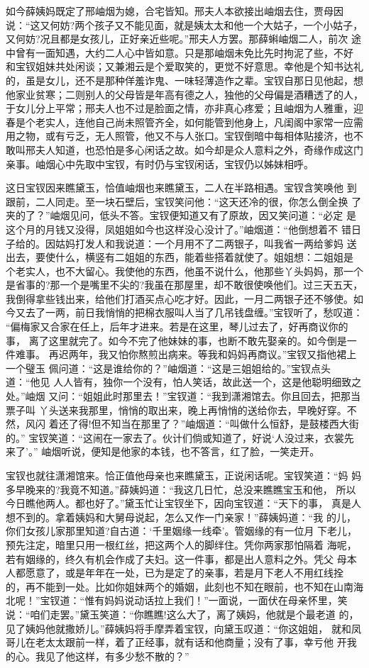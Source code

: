 如今薛姨妈既定了邢岫烟为媳，合宅皆知。邢夫人本欲接出岫烟去住，贾母因
说：“这又何妨?两个孩子又不能见面，就是姨太太和他一个大姑子，一个小姑子，
又何妨?况且都是女孩儿，正好亲近些呢。”邢夫人方罢。那薛蝌岫烟二人，前次
途中曾有一面知遇，大约二人心中皆如意。只是那岫烟未免比先时拘泥了些，不好
和宝钗姐妹共处闲谈；又兼湘云是个爱取笑的，更觉不好意思。幸他是个知书达礼
的，虽是女儿，还不是那种佯羞诈鬼、一味轻薄造作之辈。宝钗自那日见他起，想
他家业贫寒；二则别人的父母皆是年高有德之人，独他的父母偏是酒糟透了的人，
于女儿分上平常；邢夫人也不过是脸面之情，亦非真心疼爱；且岫烟为人雅重，迎
春是个老实人，连他自己尚未照管齐全，如何能管到他身上，凡闺阁中家常一应需
用之物，或有亏乏，无人照管，他又不与人张口。宝钗倒暗中每相体贴接济，也不
敢叫邢夫人知道，也恐怕是多心闲话之故。如今却是众人意料之外，奇缘作成这门
亲事。岫烟心中先取中宝钗，有时仍与宝钗闲话，宝钗仍以姊妹相呼。

这日宝钗因来瞧黛玉，恰值岫烟也来瞧黛玉，二人在半路相遇。宝钗含笑唤他
到跟前，二人同走。至一块石壁后，宝钗笑问他：“这天还冷的很，你怎么倒全换
了夹的了？”岫烟见问，低头不答。宝钗便知道又有了原故，因又笑问道：“必定
是这个月的月钱又没得，凤姐姐如今也这样没心没计了。”岫烟道：“他倒想着不
错日子给的。因姑妈打发人和我说道：一个月用不了二两银子，叫我省一两给爹妈
送出去，要使什么，横竖有二姐姐的东西，能着些搭着就使了。姐姐想：二姐姐是
个老实人，也不大留心。我使他的东西，他虽不说什么，他那些丫头妈妈，那一个
是省事的?那一个是嘴里不尖的?我虽在那屋里，却不敢很使唤他们。过三天五天，
我倒得拿些钱出来，给他们打酒买点心吃才好。因此，一月二两银子还不够使。如
今又去了一两，前日我悄悄的把棉衣服叫人当了几吊钱盘缠。”宝钗听了，愁叹道：
“偏梅家又合家在任上，后年才进来。若是在这里，琴儿过去了，好再商议你的事，
离了这里就完了。如今不完了他妹妹的事，也断不敢先娶亲的。如今倒是一件难事。
再迟两年，我又怕你熬煎出病来。等我和妈妈再商议。”宝钗又指他裙上一个璧玉
佩问道：“这是谁给你的？”岫烟道：“这是三姐姐给的。”宝钗点头道：“他见
人人皆有，独你一个没有，怕人笑话，故此送一个，这是他聪明细致之处。”岫烟
又问：“姐姐此时那里去！”宝钗道：“我到潇湘馆去。你且回去，把那当票子叫
丫头送来我那里，悄悄的取出来，晚上再悄悄的送给你去，早晚好穿。不然，风闪
着还了得!但不知当在那里了？”岫烟道：“叫做什么恒舒，是鼓楼西大街的。”
宝钗笑道：“这闹在一家去了。伙计们倘或知道了，好说‘人没过来，衣裳先来了’。”
岫烟听说，便知是他家的本钱，也不答言，红了脸，一笑走开。

宝钗也就往潇湘馆来。恰正值他母亲也来瞧黛玉，正说闲话呢。宝钗笑道：“妈
妈多早晚来的?我竟不知道。”薛姨妈道：“我这几日忙，总没来瞧瞧宝玉和他，
所以今日瞧他两人。都也好了。”黛玉忙让宝钗坐下，因向宝钗道：“天下的事，
真是人想不到的。拿着姨妈和大舅母说起，怎么又作一门亲家！”薛姨妈道：“我
的儿，你们女孩儿家那里知道?自古道：‘千里姻缘一线牵’。管姻缘的有一位月
下老儿，预先注定，暗里只用一根红丝，把这两个人的脚绊住。凭你两家那怕隔着
海呢，若有姻缘的，终久有机会作成了夫妇。这一件事，都是出人意料之外。凭父
母本人都愿意了，或是年年在一处，已为是定了的亲事，若是月下老人不用红线拴
的，再不能到一处。比如你姐妹两个的婚姻，此刻也不知在眼前，也不知在山南海
北呢！”宝钗道：“惟有妈妈说动话拉上我们！”一面说，一面伏在母亲怀里，笑
说：“咱们走罢。”黛玉笑道：“你瞧瞧!这么大了，离了姨妈，他就是个最老道
的，见了姨妈他就撒娇儿。”薛姨妈将手摩弄着宝钗，向黛玉叹道：“你这姐姐，
就和凤哥儿在老太太跟前一样，着了正经事，就有话和他商量；没有了事，幸亏他
开我的心。我见了他这样，有多少愁不散的？”

